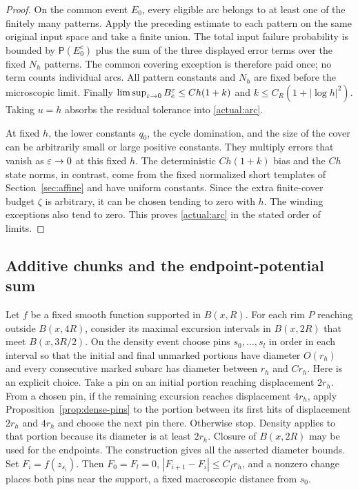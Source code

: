 \begin{proof}
On the common event $E_0$, every eligible arc belongs to at least
one of the finitely many patterns.  Apply the preceding estimate
to each pattern on the same original input space and take a
finite union.  The total input failure probability is bounded by
$\mathsf P(E_0^c)$ plus the sum of the three displayed error terms
over the fixed $N_h$ patterns.  The common covering exception is
therefore paid once; no term counts individual arcs.  All pattern
constants and $N_h$ are fixed before the microscopic limit.
Finally $\limsup_{\varepsilon\to0}B_e^\varepsilon\le Ch(1+k)$ and
$k\le C_R(1+|\log h|^2)$.  Taking $u=h$ absorbs the residual
tolerance into \eqref{actual:arc}.

At fixed $h$, the lower constants $q_0$, the cycle domination, and
the size of the cover can be arbitrarily small or large positive
constants.  They multiply errors that vanish as $\varepsilon\to0$ at this
fixed $h$.  The deterministic $Ch(1+k)$ bias and the $Ch$ state
norms, in contrast, come from the fixed normalized short templates
of Section~\ref{sec:affine} and have uniform constants.  Since the
extra finite-cover budget $\zeta$ is arbitrary, it can be chosen
tending to zero with $h$.  The winding exceptions also tend to zero.
This proves \eqref{actual:arc} in the stated order of limits.
\end{proof}

\subsection{Additive chunks and the endpoint-potential sum}

Let $f$ be a fixed smooth function supported in $B(x,R)$.  For each
rim $P$ reaching outside $B(x,4R)$, consider its maximal excursion
intervals in $B(x,2R)$ that meet $B(x,3R/2)$.  On the density event
choose pins $s_0,\ldots,s_l$ in order in each interval so that the
initial and final unmarked portions have diameter $O(r_h)$ and
every consecutive marked subarc has diameter between $r_h$ and
$Cr_h$.  Here is an explicit choice.  Take a pin on an initial
portion reaching displacement $2r_h$.  From a chosen pin, if the
remaining excursion reaches displacement $4r_h$, apply
Proposition~\ref{prop:dense-pins} to the portion between its first
hits of displacement $2r_h$ and $4r_h$ and choose the next pin there.
Otherwise stop.  Density applies to that portion because its
diameter is at least $2r_h$.  Closure of $B(x,2R)$ may be used for
the endpoints.  The construction gives all the asserted diameter
bounds.  Set $F_i=f(z_{s_i})$.  Then $F_0=F_l=0$,
$|F_{i+1}-F_i|\le C_f r_h$, and a nonzero change places both pins
near the support, a fixed macroscopic distance from $s_0$.

